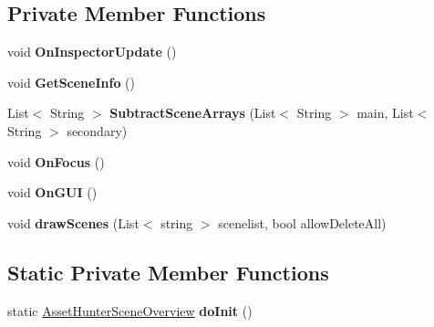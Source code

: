 \subsection*{Private Member Functions}
\begin{DoxyCompactItemize}
\item 
\mbox{\label{class_asset_hunter_scene_overview_a107de5955e1ed75b4c0864540bbdf5fa}} 
void {\bfseries On\+Inspector\+Update} ()
\item 
\mbox{\label{class_asset_hunter_scene_overview_a952acb6b191b289a1136538e9f6d1b5c}} 
void {\bfseries Get\+Scene\+Info} ()
\item 
\mbox{\label{class_asset_hunter_scene_overview_a7183fae4ad62ac4aa7fc4a020e3e61ad}} 
List$<$ String $>$ {\bfseries Subtract\+Scene\+Arrays} (List$<$ String $>$ main, List$<$ String $>$ secondary)
\item 
\mbox{\label{class_asset_hunter_scene_overview_a3f98857db09710e37e85fd4fdb566aec}} 
void {\bfseries On\+Focus} ()
\item 
\mbox{\label{class_asset_hunter_scene_overview_a02804980c36b575c9bf3a9b4922b84de}} 
void {\bfseries On\+G\+UI} ()
\item 
\mbox{\label{class_asset_hunter_scene_overview_af6e934cba2ca37411b886295f341812f}} 
void {\bfseries draw\+Scenes} (List$<$ string $>$ scenelist, bool allow\+Delete\+All)
\end{DoxyCompactItemize}
\subsection*{Static Private Member Functions}
\begin{DoxyCompactItemize}
\item 
\mbox{\label{class_asset_hunter_scene_overview_a43f73426448be64d83898bedc14d4ab5}} 
static \hyperlink{class_asset_hunter_scene_overview}{Asset\+Hunter\+Scene\+Overview} {\bfseries do\+Init} ()
\end{DoxyCompactItemize}
